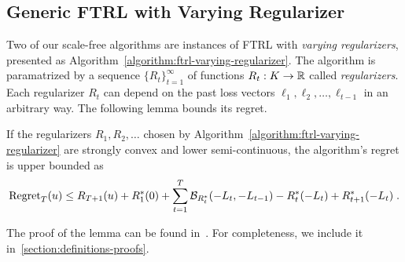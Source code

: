 \subsection{Generic FTRL with Varying Regularizer}
\label{section:generic-ftrl}

Two of our scale-free algorithms are instances of \textsc{FTRL} with
\emph{varying regularizers}, presented as
Algorithm~\ref{algorithm:ftrl-varying-regularizer}.  The algorithm is
paramatrized by a sequence $\{R_t\}_{t=1}^\infty$ of functions $R_t:K \to \mathbb{R}$
called \emph{regularizers}.  Each regularizer $R_t$ can depend on the past loss
vectors $\ell_1, \ell_2, \dots, \ell_{t-1}$ in an arbitrary way.  The following
lemma bounds its regret.

\begin{lemma}
\label{lemma:generic-regret-bound}
If the regularizers $R_1, R_2, \dots$ chosen by
Algorithm~\ref{algorithm:ftrl-varying-regularizer} are strongly convex and lower
semi-continuous, the algorithm's regret is upper bounded as
$$
\operatorname{Regret}_T(u) \le R_{T+1}(u) + R_1^*(0) + \sum_{t=1}^{T} \mathcal{B}_{R_t^*}(-L_t, -L_{t-1}) - R_t^*(-L_t) + R_{t+1}^*(-L_t) \; .
$$
\end{lemma}

The proof of the lemma can be found in~\cite{Orabona-Crammer-Cesa-Bianchi-2014}.
For completeness, we include it in~\ref{section:definitions-proofs}.
